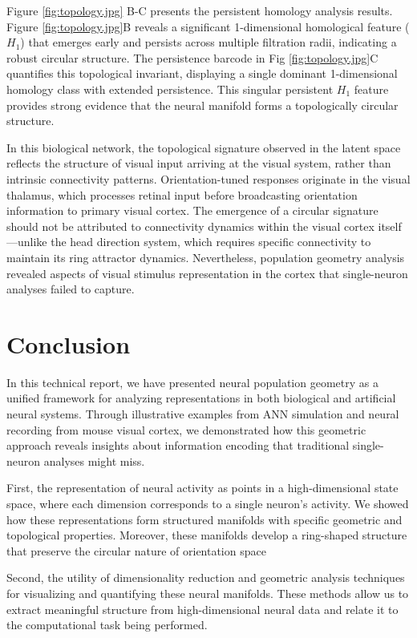 \documentclass[11pt,a4paper]{article}
\begin{document}
Figure \ref{fig:topology.jpg} B-C presents the persistent homology analysis results. Figure \ref{fig:topology.jpg}B reveals a significant 1-dimensional homological feature ($H_{1}$) that emerges early and persists across multiple filtration radii, indicating a robust circular structure. The persistence barcode in Fig \ref{fig:topology.jpg}C quantifies this topological invariant, displaying a single dominant 1-dimensional homology class with extended persistence. This singular persistent $H_{1}$ feature provides strong evidence that the neural manifold forms a topologically circular structure.

In this biological network, the topological signature observed in the latent space reflects the structure of visual input arriving at the visual system, rather than intrinsic connectivity patterns. Orientation-tuned responses originate in the visual thalamus, which processes retinal input before broadcasting orientation information to primary visual cortex. The emergence of a circular signature should not be attributed to connectivity dynamics within the visual cortex itself—unlike the head direction system, which requires specific connectivity to maintain its ring attractor dynamics. Nevertheless, population geometry analysis revealed aspects of visual stimulus representation in the cortex that single-neuron analyses failed to capture.

\section{Conclusion}

In this technical report, we have presented neural population geometry as a unified framework for analyzing representations in both biological and artificial neural systems. Through illustrative examples from ANN simulation and neural recording from mouse visual cortex, we demonstrated how this geometric approach reveals insights about information encoding that traditional single-neuron analyses might miss.

First, the representation of neural activity as points in a high-dimensional state space, where each dimension corresponds to a single neuron's activity. We showed how these representations form structured manifolds with specific geometric and topological properties. Moreover, these manifolds develop a ring-shaped structure that preserve the circular nature of orientation space

Second, the utility of dimensionality reduction and geometric analysis techniques for visualizing and quantifying these neural manifolds. These methods allow us to extract meaningful structure from high-dimensional neural data and relate it to the computational task being performed.
\end{document}
